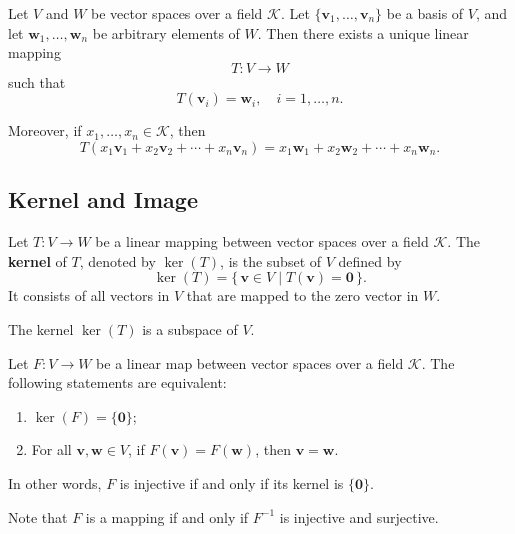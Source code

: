 \documentclass{ctexart}
\begin{document}
	\begin{mythm}
		Let $V$ and $W$ be vector spaces over a field $\mathcal{K}$.  
		Let $\{\mathbf{v}_1, \dots, \mathbf{v}_n\}$ be a basis of $V$,  
		and let $\mathbf{w}_1, \dots, \mathbf{w}_n$ be arbitrary elements of $W$.  
		Then there exists a unique linear mapping 
		\[
		T : V \to W
		\]
		such that
		\[
		T(\mathbf{v}_i) = \mathbf{w}_i, \quad i = 1, \dots, n.
		\]
		
		Moreover, if $x_1, \dots, x_n \in \mathcal{K}$, then 
		\[
		T(x_1 \mathbf{v}_1 + x_2 \mathbf{v}_2 + \cdots + x_n \mathbf{v}_n) = x_1 \mathbf{w}_1 + x_2 \mathbf{w}_2 + \cdots + x_n \mathbf{w}_n.
		\]
	\end{mythm}
	
	\subsection{Kernel and Image}
	\begin{mydef}
		Let $T : V \to W$ be a linear mapping between vector spaces over a field $\mathcal{K}$.  
		The \textbf{kernel} of $T$, denoted by $\ker(T)$, is the subset of $V$ defined by
		\[
		\ker(T) = \{\, \mathbf{v} \in V \mid T(\mathbf{v}) = \mathbf{0} \,\}.
		\]
		It consists of all vectors in $V$ that are mapped to the zero vector in $W$.  
		
	\end{mydef}
	
	\begin{myrmk}
		The kernel $\ker(T)$ is a subspace of $V$.
	\end{myrmk}
	
	\begin{mythm}
		Let $F : V \to W$ be a linear map between vector spaces over a field $\mathcal{K}$.
		The following statements are equivalent:
		\begin{enumerate}
			\item $\ker(F) = \{\mathbf{0}\}$;
			\item For all $\mathbf{v}, \mathbf{w} \in V$, if $F(\mathbf{v}) = F(\mathbf{w})$, then $\mathbf{v} = \mathbf{w}$.
		\end{enumerate}
		In other words, $F$ is injective if and only if its kernel is $\{\mathbf{0}\}$.
	\end{mythm}
	
	\begin{myrmk}
		Note that $F$ is a mapping if and only if $F^{-1}$ is injective and surjective.
	\end{myrmk}
	
\end{document}
